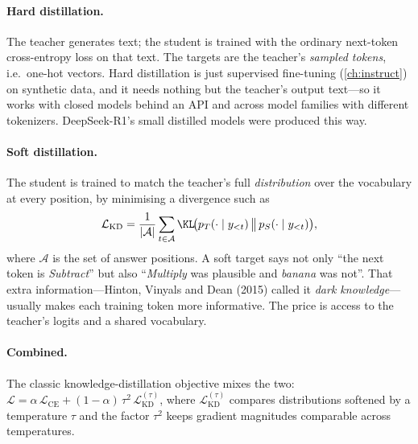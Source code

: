 \paragraph{Hard distillation.} The teacher generates text; the student is trained with the
ordinary next-token cross-entropy loss on that text. The targets are the teacher's
\emph{sampled tokens}, i.e.\ one-hot vectors. Hard distillation is just supervised fine-tuning
(\cref{ch:instruct}) on synthetic data, and it needs nothing but the teacher's output text---so
it works with closed models behind an API and across model families with different
tokenizers. DeepSeek-R1's small distilled models were produced this way.

\paragraph{Soft distillation.} The student is trained to match the teacher's full
\emph{distribution} over the vocabulary at every position, by minimising a divergence such as
\begin{equation}
\mathcal{L}_{\text{KD}} = \frac{1}{|\mathcal{A}|}\sum_{t\in\mathcal{A}}
\KL\!\big(p_T(\cdot\mid y_{<t})\,\big\|\,p_S(\cdot\mid y_{<t})\big),
\label{eq:distill:kd}
\end{equation}
where $\mathcal{A}$ is the set of answer positions. A soft target says not only ``the next
token is \emph{Subtract}'' but also ``\emph{Multiply} was plausible and \emph{banana} was not''.
That extra information---Hinton, Vinyals and Dean (2015) called it \emph{dark
knowledge}---usually makes each training token more informative. The price is access to the
teacher's logits and a shared vocabulary.

\paragraph{Combined.} The classic knowledge-distillation objective mixes the two:
$\mathcal{L} = \alpha\,\mathcal{L}_{\text{CE}} + (1-\alpha)\,\tau^2\,\mathcal{L}_{\text{KD}}^{(\tau)}$,
where $\mathcal{L}_{\text{KD}}^{(\tau)}$ compares distributions softened by a temperature $\tau$
and the factor $\tau^2$ keeps gradient magnitudes comparable across temperatures.

